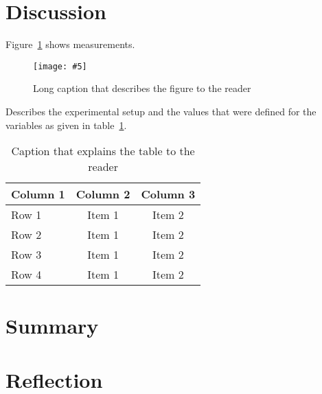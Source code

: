 \documentclass{article}
\newcommand{\includescalefigure}[5]{
\begin{figure}[htb]
\centering
\texttt{[image: \#5]}
\captionsetup{width=.8\linewidth} 
\caption[#2]{#3}
\label{#1}
\end{figure}
}
\begin{document}
\section{Discussion}
\label{sec:Discussion}

Figure~\ref{fig:measurements} shows measurements.

\includescalefigure{fig:measurements}{Measurement of System Wakeups}{Long caption that describes the figure to the reader}{1}{measurements.png}


Describes the experimental setup and the values that were defined for the variables as given in table~\ref{tab:experimentsetup}.

\begin{table}[!h]
\begin{center}
	\begin{tabular}{|l|c|c|} 
	\hline
 	\bf Column 1  & \bf Column 2  & \bf Column 3 \\
  	\hline
	Row 1 & Item 1 & Item 2 \\
	Row 2 & Item 1 & Item 2 \\
	Row 3 & Item 1 & Item 2 \\
	Row 4 & Item 1 & Item 2 \\
	\hline
	\end{tabular}
\end{center}
\caption[Variables of the experiment]{Caption that explains the table to the reader}	
\label{tab:experimentsetup}
\end{table}



\section{Summary}
\label{sec:Summary}


\section{Reflection}
\label{sec:Reflection}
\end{document}
